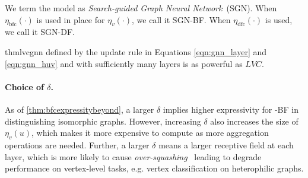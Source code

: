 
We term the model as \textit{Search-guided Graph Neural Network}~(SGN). When $\eta_{\text{bfc}}(\cdot)$ is used in place for $\eta_v(\cdot)$, we call it SGN-BF. When $\eta_{\text{dfc}}(\cdot)$ is used, we call it SGN-DF.

\begin{restatable}[]{thm}{lvcgnn}
\label{thm:lvcgnn}
\model{} defined by the update rule in Equations \ref{eqn:gnn_layer} and \ref{eqn:gnn_huv} and with sufficiently many layers is as powerful as $LVC$.
\end{restatable}

\begin{table}[b]
    \centering
    \caption{Time and space complexity comparison.}
    \label{tab:complexity}
\end{table}


\paragraph{Choice of $\delta$.} As of \cref{thm:bfcexpressitybeyond}, a larger $\delta$ implies higher expressivity for \model{}-BF in distinguishing isomorphic graphs. However, increasing $\delta$ also increases the size of $\eta_v(u)$, which  makes it more expensive to compute as more aggregation operations are needed. Further, a larger $\delta$ means a larger receptive field at each layer, which is more likely to cause \textit{over-squashing}~\citep{topping22oversquashing} leading to degrade performance on vertex-level tasks, e.g. vertex classification on heterophilic graphs. 

